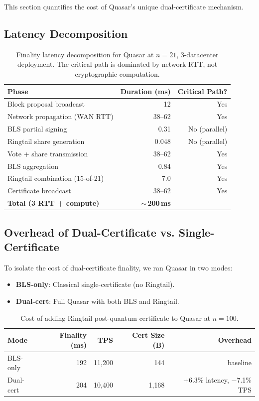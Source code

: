 \documentclass[11pt]{article}
\begin{document}
This section quantifies the cost of Quasar's unique dual-certificate mechanism.

\subsection{Latency Decomposition}

\begin{table}[h]
\centering
\begin{tabular}{@{}lrr@{}}
\toprule
\textbf{Phase} & \textbf{Duration (ms)} & \textbf{Critical Path?} \\
\midrule
Block proposal broadcast       & 12       & Yes \\
Network propagation (WAN RTT)  & 38--62   & Yes \\
BLS partial signing            & 0.31     & No (parallel) \\
Ringtail share generation      & 0.048    & No (parallel) \\
Vote + share transmission      & 38--62   & Yes \\
BLS aggregation                & 0.84     & Yes \\
Ringtail combination (15-of-21)& 7.0      & Yes \\
Certificate broadcast          & 38--62   & Yes \\
\midrule
\textbf{Total (3 RTT + compute)} & \textbf{$\sim$\,200\,ms} & \\
\bottomrule
\end{tabular}
\caption{Finality latency decomposition for Quasar at $n=21$, 3-datacenter deployment.
The critical path is dominated by network RTT, not cryptographic computation.}
\label{tab:dual-cert-breakdown}
\end{table}

\subsection{Overhead of Dual-Certificate vs. Single-Certificate}

To isolate the cost of dual-certificate finality, we ran Quasar in two modes:
\begin{itemize}
\item \textbf{BLS-only}: Classical single-certificate (no Ringtail).
\item \textbf{Dual-cert}: Full Quasar with both BLS and Ringtail.
\end{itemize}

\begin{table}[h]
\centering
\begin{tabular}{@{}lrrrr@{}}
\toprule
\textbf{Mode} & \textbf{Finality (ms)} & \textbf{TPS} & \textbf{Cert Size (B)} & \textbf{Overhead} \\
\midrule
BLS-only   & 192  & 11{,}200  & 144     & baseline \\
Dual-cert  & 204  & 10{,}400  & 1{,}168 & +6.3\% latency, $-$7.1\% TPS \\
\bottomrule
\end{tabular}
\caption{Cost of adding Ringtail post-quantum certificate to Quasar at $n=100$.}
\label{tab:dual-overhead}
\end{table}
\end{document}
